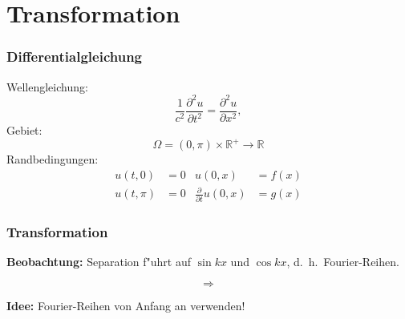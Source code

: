 %
%

\section{Transformation}

\begin{frame}
\frametitle{Differentialgleichung}

Wellengleichung:
\[
\frac{1}{c^2}
\frac{\partial^2 u}{\partial t^2}
=
\frac{\partial^2 u}{\partial x^2},
\]
Gebiet:
\[
\Omega = (0,\pi)\times \mathbb R^+\to \mathbb R
\]
Randbedingungen:
\begin{align*}
u(t,   0)&= 0&u(0,x)&=f(x)\\
u(t, \pi)&= 0&\frac{\partial}{\partial t}u(0,x)&=g(x)
\end{align*}

\end{frame}

\begin{frame}
\frametitle{Transformation}

{\bf Beobachtung:} Separation f"uhrt auf $\sin kx$ und $\cos kx$,
d.~h.~Fourier-Reihen.

\[
\Rightarrow
\]
\bigskip

{\bf Idee:} Fourier-Reihen von Anfang an verwenden!

\end{frame}


